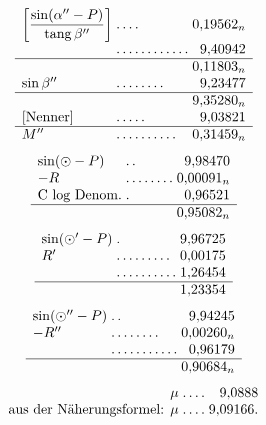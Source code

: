 \[
\begin{array}{l@{\;}l@{\;}r}
\left[\dfrac{\sin(\alpha''-P)}{\operatorname{tang}\beta''}\right]&\mathord{.}\,\mathord{.}\,\mathord{.}\,\mathord{.}&0{,}19562_n\\[3pt]
&\mathord{.}\,\mathord{.}\,\mathord{.}\,\mathord{.}\,\mathord{.}\,\mathord{.}\,\mathord{.}\,\mathord{.}\,\mathord{.}\,\mathord{.}\,\mathord{.}\,\mathord{.}&9{,}40942\\\hline
&&0{,}11803_n\\
\sin\beta''&\mathord{.}\,\mathord{.}\,\mathord{.}\,\mathord{.}\,\mathord{.}\,\mathord{.}\,\mathord{.}\,\mathord{.}&9{,}23477\\\hline
&&9{,}35280_n\\
{}[\text{Nenner}]&\mathord{.}\,\mathord{.}\,\mathord{.}\,\mathord{.}\,\mathord{.}&9{,}03821\\\hline
M''&\mathord{.}\,\mathord{.}\,\mathord{.}\,\mathord{.}\,\mathord{.}\,\mathord{.}\,\mathord{.}\,\mathord{.}\,\mathord{.}\,\mathord{.}&0{,}31459_n
\end{array}
\]
\[
\begin{array}{l@{\;}l@{\;}r}
\sin(\odot-P)&\mathord{.}\,\mathord{.}&9{,}98470\\
-R&\mathord{.}\,\mathord{.}\,\mathord{.}\,\mathord{.}\,\mathord{.}\,\mathord{.}\,\mathord{.}\,\mathord{.}&0{,}00091_n\\
\text{C log Denom.}&\mathord{.}&0{,}96521\\\hline
&&0{,}95082_n
\end{array}
\]
\[
\begin{array}{l@{\;}l@{\;}r}
\sin(\odot'-P)&\mathord{.}&9{,}96725\\
R'&\mathord{.}\,\mathord{.}\,\mathord{.}\,\mathord{.}\,\mathord{.}\,\mathord{.}\,\mathord{.}\,\mathord{.}\,\mathord{.}&0{,}00175\\
&\mathord{.}\,\mathord{.}\,\mathord{.}\,\mathord{.}\,\mathord{.}\,\mathord{.}\,\mathord{.}\,\mathord{.}\,\mathord{.}\,\mathord{.}&1{,}26454\\\hline
&&1{,}23354
\end{array}
\]
\[
\begin{array}{l@{\;}l@{\;}r}
\sin(\odot''-P)&\mathord{.}\,\mathord{.}&9{,}94245\\
-R''&\mathord{.}\,\mathord{.}\,\mathord{.}\,\mathord{.}\,\mathord{.}\,\mathord{.}\,\mathord{.}\,\mathord{.}&0{,}00260_n\\
&\mathord{.}\,\mathord{.}\,\mathord{.}\,\mathord{.}\,\mathord{.}\,\mathord{.}\,\mathord{.}\,\mathord{.}\,\mathord{.}\,\mathord{.}\,\mathord{.}&0{,}96179\\\hline
&&0{,}90684_n
\end{array}
\]
\[
\begin{array}{r@{\;}l@{\;}r}
\mu&\mathord{.}\,\mathord{.}\,\mathord{.}\,\mathord{.}&9{,}0888\\
\text{aus der Näherungsformel: }\mu&\mathord{.}\,\mathord{.}\,\mathord{.}\,\mathord{.}&9{,}09166.
\end{array}
\]

